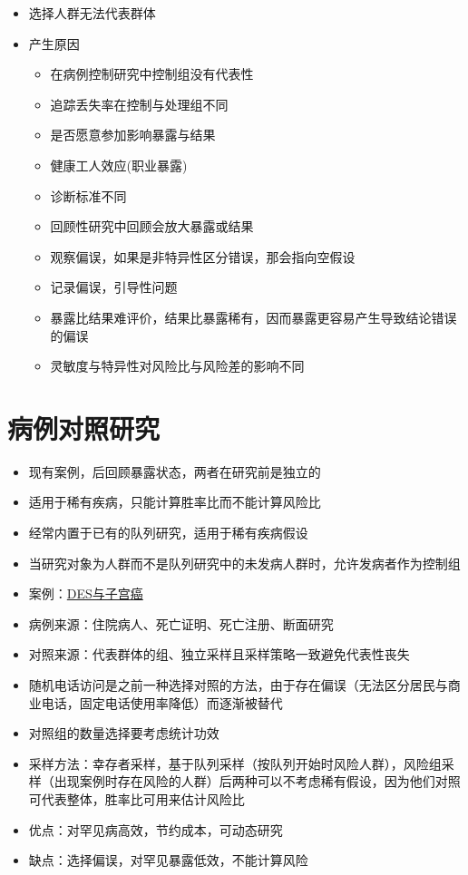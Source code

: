 \documentclass[
]{book}
\providecommand{\tightlist}{%
  \setlength{\itemsep}{0pt}\setlength{\parskip}{0pt}}
\begin{document}
\begin{itemize}
\tightlist
\item
  选择人群无法代表群体
\item
  产生原因

  \begin{itemize}
  \tightlist
  \item
    在病例控制研究中控制组没有代表性
  \item
    追踪丢失率在控制与处理组不同
  \item
    是否愿意参加影响暴露与结果
  \item
    健康工人效应(职业暴露)
  \item
    诊断标准不同
  \item
    回顾性研究中回顾会放大暴露或结果
  \item
    观察偏误，如果是非特异性区分错误，那会指向空假设
  \item
    记录偏误，引导性问题
  \item
    暴露比结果难评价，结果比暴露稀有，因而暴露更容易产生导致结论错误的偏误
  \item
    灵敏度与特异性对风险比与风险差的影响不同
  \end{itemize}
\end{itemize}

\hypertarget{ux75c5ux4f8bux5bf9ux7167ux7814ux7a76}{%
\section{病例对照研究}\label{ux75c5ux4f8bux5bf9ux7167ux7814ux7a76}}

\begin{itemize}
\tightlist
\item
  现有案例，后回顾暴露状态，两者在研究前是独立的
\item
  适用于稀有疾病，只能计算胜率比而不能计算风险比
\item
  经常内置于已有的队列研究，适用于稀有疾病假设
\item
  当研究对象为人群而不是队列研究中的未发病人群时，允许发病者作为控制组
\item
  案例：\href{http://www.cancer.gov/about-cancer/causes-prevention/risk/hormones/des-fact-sheet}{DES与子宫癌}
\item
  病例来源：住院病人、死亡证明、死亡注册、断面研究
\item
  对照来源：代表群体的组、独立采样且采样策略一致避免代表性丧失
\item
  随机电话访问是之前一种选择对照的方法，由于存在偏误（无法区分居民与商业电话，固定电话使用率降低）而逐渐被替代
\item
  对照组的数量选择要考虑统计功效
\item
  采样方法：幸存者采样，基于队列采样（按队列开始时风险人群），风险组采样（出现案例时存在风险的人群）后两种可以不考虑稀有假设，因为他们对照可代表整体，胜率比可用来估计风险比
\item
  优点：对罕见病高效，节约成本，可动态研究
\item
  缺点：选择偏误，对罕见暴露低效，不能计算风险
\end{itemize}
\end{document}
